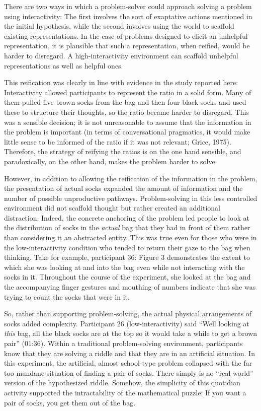 {{There are two ways in which a problem-solver could approach solving a problem using interactivity: The first involves the sort of exaptative actions mentioned in the initial hypothesis, while the second involves using the world to scaffold existing representations. In the case of problems designed to elicit an unhelpful representation, it is plausible that such a representation, when reified, would be harder to disregard.
A high-interactivity environment can scaffold unhelpful representations as well as helpful ones.

This reification was clearly in line with evidence in the study reported here: Interactivity allowed participants to represent the ratio in a solid form. Many of them pulled five brown socks from the bag and then four black socks and used these to structure their thoughts, so the ratio became harder to disregard. This was a sensible decision; it is not unreasonable to assume that the information in the problem is important (in terms of conversational pragmatics, it would make little sense to be informed of the ratio if it was not relevant; Grice, 1975).
Therefore, the strategy of reifying the ratios is on the one hand sensible, and paradoxically, on the other hand, makes the problem harder to solve.

However, in addition to allowing the reification of the information in the problem, the presentation of actual socks expanded the amount of information and the number of possible unproductive pathways.
Problem-solving in this less controlled environment did not scaffold thought but rather created an additional distraction. Indeed, the concrete anchoring of the problem led people to look at the distribution of socks in the \emph{actual} bag that they had in front of them rather than considering it an abstracted entity. This was true even for those who were in the low-interactivity condition who tended to return their gaze to the bag when thinking. Take for example, participant 36: Figure 3 demonstrates the extent to which she was looking at and into the bag even while not interacting with the socks in it. Throughout the course of the experiment, she looked at the bag and the accompanying finger gestures and mouthing of numbers indicate that she was trying to count the socks that were in it.

So, rather than supporting problem-solving, the actual physical arrangements of socks added complexity. Participant 26 (low-interactivity) said ``Well looking at \emph{this} bag, all the black socks are at the top so it would take a while to get a brown pair'' (01:36). Within a traditional problem-solving environment, participants know that they are solving a riddle and that they are in an artificial situation. In this experiment, the artificial, almost school-type problem collapsed with the far too mundane situation of finding a pair of socks. There simply is no ``real-world'' version of the hypothesized riddle. Somehow, the simplicity of this quotidian activity supported the intractability of the mathematical puzzle: If you want a pair of socks, you get them out of the bag.

}}

